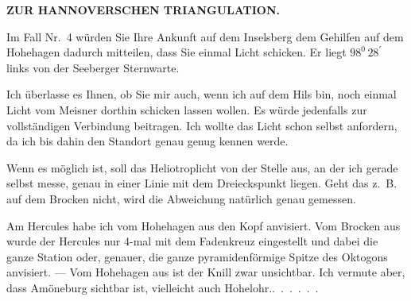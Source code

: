 \par\clearpage
\noindent\null\hfill{\small\textbf{ZUR HANNOVERSCHEN TRIANGULATION.}}\hfill{}\par\medskip
\par\noindent\hspace*{\parindent}Im Fall Nr.~4 würden Sie Ihre Ankunft auf dem Inselsberg dem Gehilfen auf dem Hohehagen dadurch mitteilen, dass Sie einmal Licht schicken.
Er liegt \(98^{0}\,28^{\prime}\) links von der Seeberger Sternwarte.
\par\noindent\hspace*{\parindent}Ich überlasse es Ihnen, ob Sie mir auch, wenn ich auf dem Hils bin, noch einmal Licht vom Meisner dorthin schicken lassen wollen.
Es würde jedenfalls zur vollständigen Verbindung beitragen.
Ich wollte das Licht schon selbst anfordern, da ich bis dahin den Standort genau genug kennen werde.
\par\noindent\hspace*{\parindent}Wenn es möglich ist, soll das Heliotroplicht von der Stelle aus, an der ich gerade selbst messe, genau in einer Linie mit dem Dreieckspunkt liegen. Geht das z.~B. auf dem Brocken nicht, wird die Abweichung natürlich genau gemessen.
\par\noindent\hspace*{\parindent}Am Hercules habe ich vom Hohehagen aus den Kopf anvisiert. Vom Brocken aus wurde der Hercules nur 4-mal mit dem Fadenkreuz eingestellt und dabei die ganze Station oder, genauer, die ganze pyramidenförmige Spitze des Oktogons anvisiert. --- Vom Hohehagen aus ist der Knill zwar unsichtbar. Ich vermute aber, dass Amöneburg sichtbar ist, vielleicht auch \mbox{Hohelohr.\quad.\ .\ .\ .\ .\ .}
\par
\endgroup
